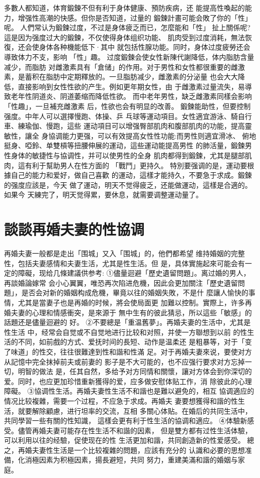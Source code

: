 \documentclass[12pt,UTF8]{ctexbook}
\begin{document}
多數人都知道，体育鍛鍊不但有利于身体健康、預防疾病，还
能提高性喚起的能力，增强性高潮的快感。但你是否知道，过量的
鍛鍊計畫可能会敗了你的「性」呢。
人們常认为鍛鍊过度，不过是身体疲乏而已，怎麼能和「性」
扯上關係呢?這是因为强度过大的鍛鍊，不仅使得身体组织功能、
肌肉受到过度消耗，無法恢復，还会使身体各种機能低下·其中
就包括性腺功能。同时，身体过度疲勞还会導致体力不支，影响
「性」趣。
过度鍛鍊会使女性新陳代謝降低，体内脂肪含量减少，而脂肪
对雌激素具有「倉储」的作用。对于男性和女性都很重要的雌激
素，是蓄积在脂肪中定期釋放的。一旦脂肪减少，雌激素的分泌量
也会大大降低，直接影响到女性性欲的产生。例如更年期女性，由
于雌激素过量流失，易導致老年性阴道炎、阴道萎缩而降低性欲。
而中老年男性，缺乏雌激素同樣会影响「性趣」，一旦補充雌激素
后，性欲也会有明显的改善。
鍛鍊能助性，但要控制强度。中年人可以選擇慢跑、体操、乒
乓球等運动項目。女性適宜游泳、騎自行車、練瑜伽、慢跑，這些
運动項目可以增强臀部肌肉和腹部肌肉的功能，提高靈敏性，讓全
身協调能力更强，可以有效提高女性性功能:而男性则適宜滑冰、
俯地挺身、啞鈴、单雙槓等扭腰伸展的運动，這些運动能提高男性
的肺活量，鍛鍊男性身体的敏捷性与協调性，并可以使男性的全身
肌肉都得到鍛鍊，尤其是腿部肌肉，這有利于幫助男人在性方面的
「戰鬥」更持久。
特別要强调的是，運动要根據自己的能力和爱好，做自己喜歡
的運动，這樣才能持久，不要急于求成。鍛鍊的强度应該是，今天
做了運动，明天不觉得疲乏，还能做運动，這樣是合適的。如果今
天練完了，明天觉得累，要休息，就需要调整運动量了。

\section{談談再婚夫妻的性協调}

再婚夫妻一般都是走出「围城」又入「围城」的，他們都希望
维持婚姻的完整性，包括夫妻感情和夫妻生活，尤其是性生活。但
是，具体實施起來可能会有一定的障礙，现给几條建議供参考:
①儘量迴避「歷史遺留問題」。离过婚的男人，再談婚論嫁常
会小心翼翼，唯恐再次陷进危機，因此会更加關注「歷史遺留問
題」，是否会对新的婚姻构成危機，畢竟以往的婚姻失敗，不是什
麼讓人愉快的事情，尤其是當妻子也是再婚的时候，將会使局面更
加難以控制。實際上，许多再婚夫妻的心理和情感衝突，是來源于
無中生有的彼此猜忌，所以這些「敏感」的話題还是儘量迴避的
好。
②不要總是「重温舊夢」。再婚夫妻的生活中，尤其是性生活
中，经常会自觉或不自觉地进行比较和对照，并使一方聯想到以前
的性生活的不同，如前戲的方式、爱抚时间的長短、动作是温柔还
是粗暴等，对于「变了味道」的性交，往往很難達到性和諧和性滿
足。对于再婚夫妻來说，要使对方从記憶中完全抹掉前夫或前妻的
影子是不大可能的，也不应强行要求对方忘掉一切，明智的做法
是，任其自然，多给予对方同情和關懷，讓对方体会到你深切的
爱。同时，也应更加珍惜重新獲得的爱，应多做安慰体贴工作，消
除彼此的心理障礙。
③協调性生活。再婚夫妻性生活不和諧也是難以避免的，相互
協调適应的情况比较複雜，需要一个过程，不应急于求成。再婚夫
妻要想獲得和諧的性生活，就要解除顧慮，进行坦率的交流，互相
多關心体贴。在婚后的共同生活中，共同學習一些有關的性知識，
這樣会更有利于性生活的協调和適应。
④体驗新感受。儘管再婚夫妻可能存在性生活不和諧的因素，
但是雙方都有过性生活体驗，可以利用以往的经驗，促使现在的性
生活更加和諧，共同創造新的性爱感受。
總之，再婚夫妻性生活是一个比较複雜的問題，应該有充分的
认識和必要的思想准備，化消極因素为积極因素，揚長避短，共同
努力，重建美滿和諧的婚姻与家庭。
\end{document}
